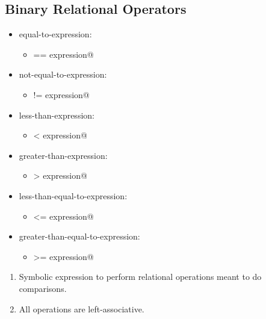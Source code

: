 \subsection{Binary Relational Operators}
\begin{itemize}[before=\itshape, label={}]
	\item equal-to-expression:
	\begin{itemize}[before=\itshape, label={}]
		\item \lstinline@expression == expression@
	\end{itemize}
	\item not-equal-to-expression:
	\begin{itemize}[before=\itshape, label={}]
		\item \lstinline@expression != expression@
	\end{itemize}
	\item less-than-expression:
	\begin{itemize}[before=\itshape, label={}]
		\item \lstinline@expression < expression@
	\end{itemize}
	\item greater-than-expression:
	\begin{itemize}[before=\itshape, label={}]
		\item \lstinline@expression > expression@
	\end{itemize}
	\item less-than-equal-to-expression:
	\begin{itemize}[before=\itshape, label={}]
		\item \lstinline@expression <= expression@
	\end{itemize}
	\item greater-than-equal-to-expression:
	\begin{itemize}[before=\itshape, label={}]
		\item \lstinline@expression >= expression@
	\end{itemize}
\end{itemize}
\begin{enumerate}
	\item Symbolic expression to perform relational operations meant to do comparisons.
	\item All operations are left-associative.
\end{enumerate}

